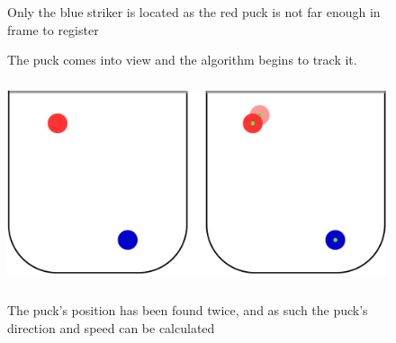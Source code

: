 \documentclass[letterpaper, 12 pt, conference]{ieeeconf}
\begin{document}
\begin{figure}
\centering
{}
\caption{Only the blue striker is located as the red puck is not far enough in frame to register}
\end{figure}


\begin{figure}
\centering
{}
\caption{The puck comes into view and the algorithm begins to track it.}
\end{figure}



\begin{figure}
\centering
\includegraphics[height=6cm, width=12cm]{frame_2}%
\label{frame_2}
\caption{The puck’s position has been found twice, and as such the puck’s direction and speed can be calculated}
\end{figure}
\end{document}
